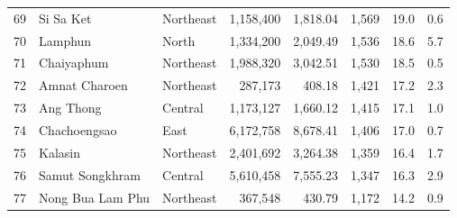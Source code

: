 \begin{longtable}{rllrrrrr}
69 & Si Sa Ket & Northeast & 1,158,400 & 1,818.04 & 1,569 & 19.0 & 0.6 \\
70 & Lamphun & North & 1,334,200 & 2,049.49 & 1,536 & 18.6 & 5.7 \\
71 & Chaiyaphum & Northeast & 1,988,320 & 3,042.51 & 1,530 & 18.5 & 0.5 \\
72 & Amnat Charoen & Northeast & 287,173 & 408.18 & 1,421 & 17.2 & 2.3 \\
73 & Ang Thong & Central & 1,173,127 & 1,660.12 & 1,415 & 17.1 & 1.0 \\
74 & Chachoengsao & East & 6,172,758 & 8,678.41 & 1,406 & 17.0 & 0.7 \\
75 & Kalasin & Northeast & 2,401,692 & 3,264.38 & 1,359 & 16.4 & 1.7 \\
76 & Samut Songkhram & Central & 5,610,458 & 7,555.23 & 1,347 & 16.3 & 2.9 \\
77 & Nong Bua Lam Phu & Northeast & 367,548 & 430.79 & 1,172 & 14.2 & 0.9 \\
\end{longtable}
